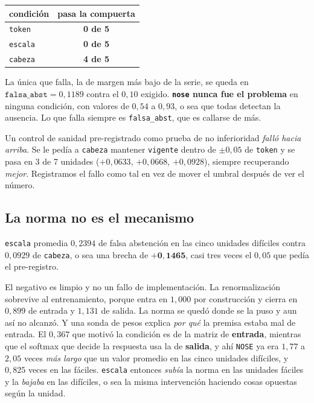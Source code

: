 \documentclass[11pt,a4paper]{article}
\begin{document}
\begin{center}
\begin{tabular}{lc}
\toprule
condición & pasa la compuerta \\
\midrule
\texttt{token}  & \textbf{0 de 5} \\
\texttt{escala} & \textbf{0 de 5} \\
\texttt{cabeza} & \textbf{4 de 5} \\
\bottomrule
\end{tabular}
\end{center}

La única que falla, la de margen más bajo de la serie, se queda en
$\texttt{falsa\_abst} = 0{,}1189$ contra el $0{,}10$ exigido. \textbf{\texttt{nose} nunca fue el
problema} en ninguna condición, con valores de $0{,}54$ a $0{,}93$, o sea que todas detectan la
ausencia. Lo que falla siempre es \texttt{falsa\_abst}, que es callarse de más.

Un control de sanidad pre-registrado como prueba de no inferioridad \emph{falló hacia arriba}. Se le
pedía a \texttt{cabeza} mantener \texttt{vigente} dentro de $\pm 0{,}05$ de \texttt{token} y se pasa
en 3 de 7 unidades ($+0{,}0633$, $+0{,}0668$, $+0{,}0928$), siempre recuperando \emph{mejor}.
Registramos el fallo como tal en vez de mover el umbral después de ver el número.

\subsection{La norma no es el mecanismo}
\label{sec:escala}

\texttt{escala} promedia $0{,}2394$ de falsa abstención en las cinco unidades difíciles contra
$0{,}0929$ de \texttt{cabeza}, o sea una brecha de $\mathbf{+0{,}1465}$, casi tres veces el $0{,}05$
que pedía el pre-registro.

El negativo es limpio y no un fallo de implementación. La renormalización sobrevive al entrenamiento,
porque entra en $1{,}000$ por construcción y cierra en $0{,}899$ de entrada y $1{,}131$ de salida. La
norma se quedó donde se la puso y aun así no alcanzó. Y una sonda de pesos explica \emph{por qué} la
premisa estaba mal de entrada. El $0{,}367$ que motivó la condición es de la matriz de
\textbf{entrada}, mientras que el softmax que decide la respuesta usa la de \textbf{salida}, y ahí
\texttt{NOSE} ya era $1{,}77$ a $2{,}05$ veces \emph{más largo} que un valor promedio en las cinco
unidades difíciles, y $0{,}825$ veces en las fáciles. \texttt{escala} entonces \emph{subía} la norma
en las unidades fáciles y la \emph{bajaba} en las difíciles, o sea la misma intervención haciendo
cosas opuestas según la unidad.
\end{document}
